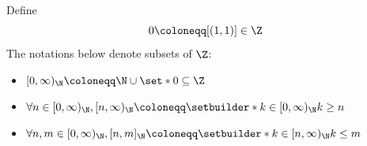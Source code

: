 \bigskip

\begin{remark}
  Define
  \[
    0 \coloneqq [(1, 1)] \in \Z
  \]
  The notations below denote subsets of $\Z$:
  \begin{itemize}
    \item $[0, \infty)_{\N} \coloneqq \N \cup \set*{0} \subseteq \Z$
    \item $\forall n \in [0, \infty)_{\N}, [n, \infty)_{\N}
            \coloneqq \setbuilder*{k \in [0, \infty)_{\N}}{k \geq n}$
    \item $\forall n, m \in [0, \infty)_{\N}, [n, m]_{\N}
            \coloneqq \setbuilder*{k \in [n, \infty)_{\N}}{k \leq m}$
  \end{itemize}
\end{remark}
